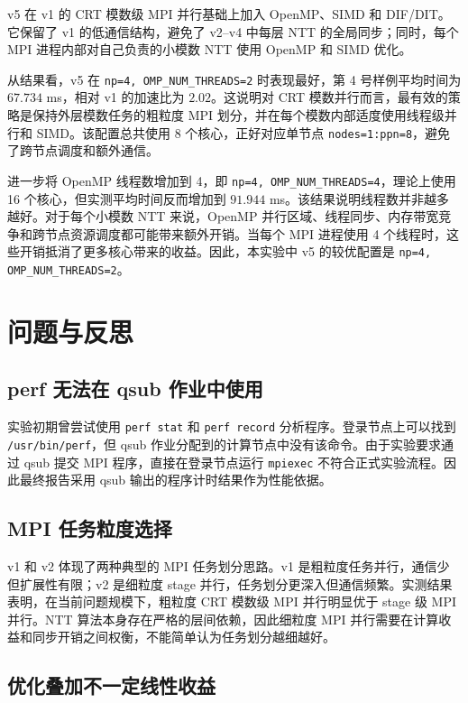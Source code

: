 \documentclass[a4paper]{article}
\begin{document}
v5 在 v1 的 CRT 模数级 MPI 并行基础上加入 OpenMP、SIMD 和 DIF/DIT。它保留了 v1 的低通信结构，避免了 v2--v4 中每层 NTT 的全局同步；同时，每个 MPI 进程内部对自己负责的小模数 NTT 使用 OpenMP 和 SIMD 优化。

从结果看，v5 在 \texttt{np=4, OMP\_NUM\_THREADS=2} 时表现最好，第 4 号样例平均时间为 $67.734$ ms，相对 v1 的加速比为 $2.02$。这说明对 CRT 模数并行而言，最有效的策略是保持外层模数任务的粗粒度 MPI 划分，并在每个模数内部适度使用线程级并行和 SIMD。该配置总共使用 8 个核心，正好对应单节点 \texttt{nodes=1:ppn=8}，避免了跨节点调度和额外通信。

进一步将 OpenMP 线程数增加到 4，即 \texttt{np=4, OMP\_NUM\_THREADS=4}，理论上使用 16 个核心，但实测平均时间反而增加到 $91.944$ ms。该结果说明线程数并非越多越好。对于每个小模数 NTT 来说，OpenMP 并行区域、线程同步、内存带宽竞争和跨节点资源调度都可能带来额外开销。当每个 MPI 进程使用 4 个线程时，这些开销抵消了更多核心带来的收益。因此，本实验中 v5 的较优配置是 \texttt{np=4, OMP\_NUM\_THREADS=2}。

\section{问题与反思}

\subsection{perf 无法在 qsub 作业中使用}

实验初期曾尝试使用 \texttt{perf stat} 和 \texttt{perf record} 分析程序。登录节点上可以找到 \texttt{/usr/bin/perf}，但 qsub 作业分配到的计算节点中没有该命令。由于实验要求通过 qsub 提交 MPI 程序，直接在登录节点运行 \texttt{mpiexec} 不符合正式实验流程。因此最终报告采用 qsub 输出的程序计时结果作为性能依据。

\subsection{MPI 任务粒度选择}

v1 和 v2 体现了两种典型的 MPI 任务划分思路。v1 是粗粒度任务并行，通信少但扩展性有限；v2 是细粒度 stage 并行，任务划分更深入但通信频繁。实测结果表明，在当前问题规模下，粗粒度 CRT 模数级 MPI 并行明显优于 stage 级 MPI 并行。NTT 算法本身存在严格的层间依赖，因此细粒度 MPI 并行需要在计算收益和同步开销之间权衡，不能简单认为任务划分越细越好。

\subsection{优化叠加不一定线性收益}
\end{document}
